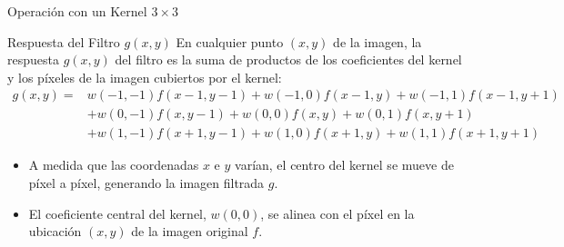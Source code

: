 \documentclass[10pt]{beamer}
\newcommand{\eqnum}[1]{\tag{#1}} %
\begin{document}
\begin{frame}[fragile]{Operación con un Kernel $3 \times 3$}\tiny
\begin{block}{Respuesta del Filtro $g(x,y)$}
En cualquier punto $(x,y)$ de la imagen, la respuesta $g(x,y)$ del filtro es la suma de productos de los coeficientes del kernel y los píxeles de la imagen cubiertos por el kernel:
\begin{align}
g(x,y) = &w(-1,-1)f(x-1,y-1) + w(-1,0)f(x-1,y) + w(-1,1)f(x-1,y+1) \nonumber \\
&+ w(0,-1)f(x,y-1)   + w(0,0)f(x,y)     + w(0,1)f(x,y+1) \nonumber \\
&+ w(1,-1)f(x+1,y-1)   + w(1,0)f(x+1,y)     + w(1,1)f(x+1,y+1) \eqnum{3-30}
\end{align}
\end{block}
\vspace{0.1cm}
{\footnotesize
\begin{itemize}
\item A medida que las coordenadas $x$ e $y$ varían, el centro del kernel se mueve de píxel a píxel, generando la imagen filtrada $g$.
\item El coeficiente central del kernel, $w(0,0)$, se alinea con el píxel en la ubicación $(x,y)$ de la imagen original $f$.
\end{itemize}
}
\end{frame}
\end{document}
